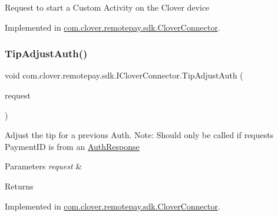Request to start a Custom Activity on the Clover device 



Implemented in \hyperlink{classcom_1_1clover_1_1remotepay_1_1sdk_1_1_clover_connector_a7c4a08c49e7285e95d7e36340ebe3306}{com.\+clover.\+remotepay.\+sdk.\+Clover\+Connector}.

\mbox{\label{interfacecom_1_1clover_1_1remotepay_1_1sdk_1_1_i_clover_connector_a815c8be2012ebda06247c059771717cc}} 
\subsubsection{\texorpdfstring{Tip\+Adjust\+Auth()}{TipAdjustAuth()}}
{\footnotesize\ttfamily void com.\+clover.\+remotepay.\+sdk.\+I\+Clover\+Connector.\+Tip\+Adjust\+Auth (\begin{DoxyParamCaption}\item[{\hyperlink{classcom_1_1clover_1_1remotepay_1_1sdk_1_1_tip_adjust_auth_request}{Tip\+Adjust\+Auth\+Request}}]{request }\end{DoxyParamCaption})}



Adjust the tip for a previous Auth. Note\+: Should only be called if request\textquotesingle{}s Payment\+ID is from an \hyperlink{classcom_1_1clover_1_1remotepay_1_1sdk_1_1_auth_response}{Auth\+Response} 


\begin{DoxyParams}{Parameters}
{\em request} & \\
\hline
\end{DoxyParams}
\begin{DoxyReturn}{Returns}

\end{DoxyReturn}


Implemented in \hyperlink{classcom_1_1clover_1_1remotepay_1_1sdk_1_1_clover_connector_a84fa27d8c605594999b39e619b20359e}{com.\+clover.\+remotepay.\+sdk.\+Clover\+Connector}.

\mbox{\label{interfacecom_1_1clover_1_1remotepay_1_1sdk_1_1_i_clover_connector_a1d501a736452123be1dd8f42157389e3}} 
